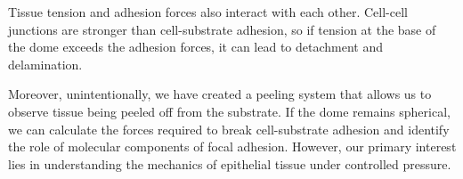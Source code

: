 Tissue tension and adhesion forces also interact with each other. Cell-cell junctions are stronger than cell-substrate adhesion, so if tension at the base of the dome exceeds the adhesion forces, it can lead to detachment and delamination.  

Moreover, unintentionally, we have created a peeling system that allows us to observe tissue being peeled off from the substrate. If the dome remains spherical, we can calculate the forces required to break cell-substrate adhesion and identify the role of molecular components of focal adhesion. However, our primary interest lies in understanding the mechanics of epithelial tissue under controlled pressure.
